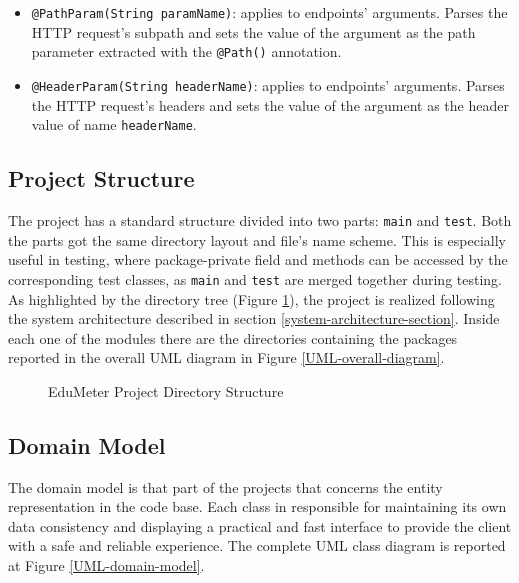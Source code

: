 \begin{itemize}
	\item \verb|@PathParam(String paramName)|: applies to endpoints' arguments. Parses the HTTP request's subpath and sets the value of the argument as the path parameter extracted with the \verb|@Path()| annotation.

	\item \verb|@HeaderParam(String headerName)|: applies to endpoints' arguments. Parses the HTTP request's headers and sets the value of the argument as the header value of name \verb|headerName|.
\end{itemize}

\subsection{Project Structure}
The project has a standard structure divided into two parts: \verb|main| and \verb|test|. Both the parts got the same directory layout and file's name scheme. This is especially useful in testing, where package-private field and methods can be accessed by the corresponding test classes, as \verb|main| and \verb|test| are merged together during testing. As highlighted by the directory tree (Figure \ref{fig:tree}), the project is realized following the system architecture described in section \ref{system-architecture-section}. Inside each one of the modules there are the directories containing the packages reported in the overall UML diagram in Figure \ref{UML-overall-diagram}.

\begin{figure}[H]
	\small
	\begin{minipage}{0.8\textwidth}
	\end{minipage}
	\caption[Project structure]{EduMeter Project Directory Structure}
	\label{fig:tree}
\end{figure}

\subsection{Domain Model}
The domain model is that part of the projects that concerns the entity representation in the code base. Each class in responsible for maintaining its own data consistency and displaying a practical and fast interface to provide the client with a safe and reliable experience. The complete UML class diagram is reported at Figure \ref{UML-domain-model}.

